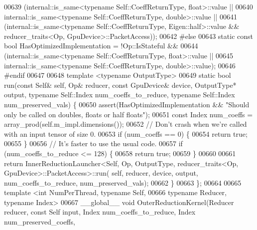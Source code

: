 \begin{DoxyCode}
00639       (internal::is\_same<typename Self::CoeffReturnType, float>::value ||
00640        internal::is\_same<typename Self::CoeffReturnType, double>::value ||
00641        (internal::is\_same<typename Self::CoeffReturnType, Eigen::half>::value && reducer\_traits<Op,
       GpuDevice>::PacketAccess));
00642 \textcolor{preprocessor}{#else}
00643   \textcolor{keyword}{static} \textcolor{keyword}{const} \textcolor{keywordtype}{bool} HasOptimizedImplementation = !Op::IsStateful &&
00644                                                  (internal::is\_same<typename Self::CoeffReturnType,
       float>::value ||
00645                                                   internal::is\_same<typename Self::CoeffReturnType,
       double>::value);
00646 \textcolor{preprocessor}{#endif}
00647 
00648   \textcolor{keyword}{template} <\textcolor{keyword}{typename} OutputType>
00649   \textcolor{keyword}{static} \textcolor{keywordtype}{bool} run(\textcolor{keyword}{const} Self& \textcolor{keyword}{self}, Op& reducer, \textcolor{keyword}{const} GpuDevice& device, OutputType* output, \textcolor{keyword}{typename} 
      Self::Index num\_coeffs\_to\_reduce, \textcolor{keyword}{typename} Self::Index num\_preserved\_vals) \{
00650     assert(HasOptimizedImplementation && \textcolor{stringliteral}{"Should only be called on doubles, floats or half floats"});
00651     \textcolor{keyword}{const} Index num\_coeffs = array\_prod(\textcolor{keyword}{self}.m\_impl.dimensions());
00652     \textcolor{comment}{// Don't crash when we're called with an input tensor of size 0.}
00653     \textcolor{keywordflow}{if} (num\_coeffs == 0) \{
00654       \textcolor{keywordflow}{return} \textcolor{keyword}{true};
00655     \}
00656     \textcolor{comment}{// It's faster to use the usual code.}
00657     \textcolor{keywordflow}{if} (num\_coeffs\_to\_reduce <= 128) \{
00658       \textcolor{keywordflow}{return} \textcolor{keyword}{true};
00659     \}
00660 
00661     \textcolor{keywordflow}{return} InnerReductionLauncher<Self, Op, OutputType, reducer\_traits<Op, GpuDevice>::PacketAccess>::run(\textcolor{keyword}{
      self}, reducer, device, output, num\_coeffs\_to\_reduce, num\_preserved\_vals);
00662   \}
00663 \};
00664 
00665 \textcolor{keyword}{template} <\textcolor{keywordtype}{int} NumPerThread, \textcolor{keyword}{typename} Self,
00666           \textcolor{keyword}{typename} Reducer, \textcolor{keyword}{typename} Index>
00667 \_\_global\_\_ \textcolor{keywordtype}{void} OuterReductionKernel(Reducer reducer, \textcolor{keyword}{const} Self input, Index num\_coeffs\_to\_reduce, Index 
      num\_preserved\_coeffs,

\end{DoxyCode}
